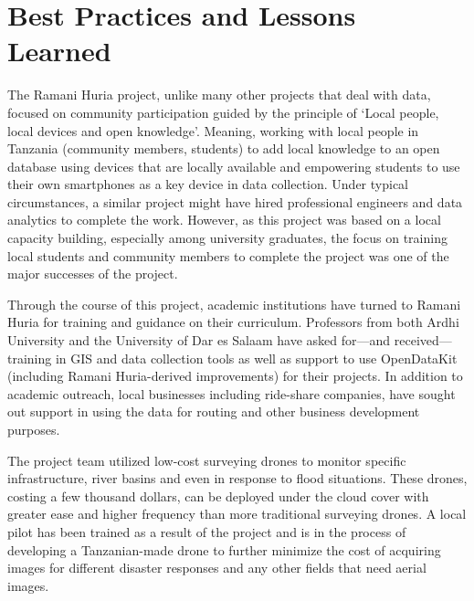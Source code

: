 \documentclass[a4paper,12pt,twoside]{article}
\begin{document}
\section{Best Practices and Lessons Learned}

\begin{multicols}{2}

The Ramani Huria project, unlike many other projects that deal with data, focused on community participation guided by the principle of ‘Local people, local devices and open knowledge'. Meaning,  working with local people in Tanzania (community members, students) to add local knowledge to an open database using devices that are locally available and empowering students to use  their own smartphones as a key device in data collection. Under typical circumstances, a similar project might have hired professional engineers and data analytics to complete the work. However, as this project was based on a local capacity building, especially among university graduates, the focus on training local students and community members to complete the project was one of the major successes of the project.

Through the course of this project, academic institutions have turned to Ramani Huria for training and guidance on their curriculum. Professors from both Ardhi University and the University of Dar es Salaam have asked for—and received—training in GIS and data collection tools as well as support to use OpenDataKit (including Ramani Huria-derived improvements) for their projects. In addition to academic outreach, local businesses including ride-share companies, have sought out support in using the data for routing and other business development purposes. 

The project team utilized low-cost surveying drones to monitor specific infrastructure, river basins and even in response to flood situations. These drones, costing a few thousand dollars, can be deployed under the cloud cover with greater ease and higher frequency than more traditional surveying drones.   A local pilot has been trained as a result of the project and is in the process of developing a Tanzanian-made drone to further minimize the cost of acquiring images for different disaster responses and any other fields that need aerial images.
\end{multicols}


\end{document}
\end{multicols}
\end{document}
